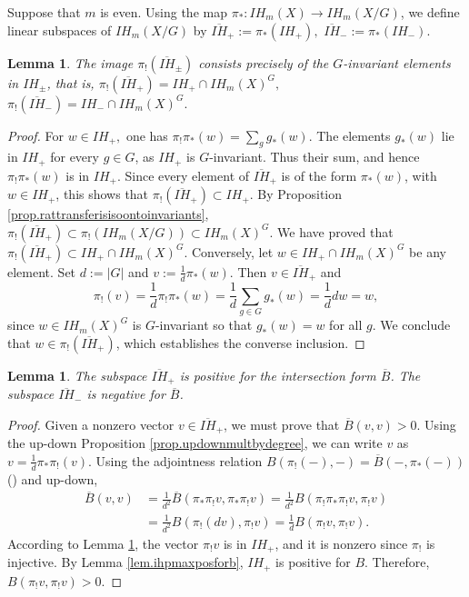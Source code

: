 \documentclass{amsart}
\newtheorem{lemma}[thm]{Lemma}
\theoremstyle{definition}
\theoremstyle{remark}
\begin{document}
Suppose that $m$ is even.
Using the map $\pi_*: IH_m (X) \to IH_m (X/G)$, we define linear subspaces
of $IH_m (X/G)$ by
$\overline{IH}_+ := \pi_* (IH_+),$
$\overline{IH}_- := \pi_* (IH_-).$

\begin{lemma} \label{lem.transfoihisihcapinv}
The image $\pi_! (\overline{IH}_\pm)$ consists precisely of the $G$-invariant
elements in $IH_\pm$, that is,
$\pi_! (\overline{IH}_+) = IH_+ \cap IH_m (X)^G,$
   $\pi_! (\overline{IH}_-) = IH_- \cap IH_m (X)^G.$
\end{lemma}
\begin{proof}
For $w\in IH_+,$ one has $\pi_! \pi_* (w)= \sum_g g_* (w)$.
The elements $g_* (w)$ lie in $IH_+$ for every $g\in G$, 
as $IH_+$ is $G$-invariant.
Thus their sum, and hence $\pi_! \pi_* (w)$ is in $IH_+$.
Since every element of $\overline{IH}_+$ is of the form $\pi_* (w)$,
with $w\in IH_+$, this shows that $\pi_! (\overline{IH}_+) \subset IH_+$.
By Proposition \ref{prop.rattransferisisoontoinvariants},
$\pi_! (\overline{IH}_+) \subset \pi_! (IH_m (X/G))
   \subset IH_m (X)^G.$
We have proved that $\pi_! (\overline{IH}_+) \subset IH_+ \cap IH_m (X)^G$.
Conversely, let $w \in IH_+ \cap IH_m (X)^G$ be any element.
Set $d:=|G|$ and $v := \frac{1}{d} \pi_* (w)$. 
Then $v\in \overline{IH}_+$ and
\[ \pi_! (v) = \mbox{$\frac{1}{d}$} \pi_! \pi_* (w)
   =  \mbox{$\frac{1}{d}$} \sum_{g\in G} g_* (w) =    \mbox{$\frac{1}{d}$} dw =w, \]
since $w\in IH_m (X)^G$ is $G$-invariant so that $g_* (w)=w$ for all $g$.
We conclude that $w\in \pi_! (\overline{IH}_+)$, which 
establishes the converse inclusion.
\end{proof}


\begin{lemma} \label{lem.oihpispos}
The subspace $\overline{IH}_+$ is positive for the 
intersection form $\overline{B}$.
The subspace $\overline{IH}_-$ is negative for $\overline{B}$. 
\end{lemma}
\begin{proof}
Given a nonzero vector $v \in \overline{IH}_+$, we must prove that
$\overline{B}(v,v)>0$.
Using the up-down Proposition \ref{prop.updownmultbydegree}, we can write
$v$ as $v = \frac{1}{d} \pi_* \pi_! (v).$
Using the adjointness relation
$B (\pi_! (-), -) = \overline{B} (-, \pi_* (-))$ (\cite[p. 390, 3.]{gmlefschetz})
and up-down,
\begin{align*}  
\overline{B} (v,v)
&= \mbox{$\frac{1}{d^2}$} \overline{B} (\pi_* \pi_! v, \pi_* \pi_! v) 
 = \mbox{$\frac{1}{d^2}$} B (\pi_! \pi_* \pi_! v, \pi_! v) \\
&= \mbox{$\frac{1}{d^2}$} B (\pi_! (dv), \pi_! v) 
 = \mbox{$\frac{1}{d}$} B (\pi_! v, \pi_! v).
\end{align*}   
According to Lemma \ref{lem.transfoihisihcapinv}, 
the vector $\pi_! v$ is in $IH_+$, and it is nonzero since
$\pi_!$ is injective.
By Lemma \ref{lem.ihpmaxposforb}, $IH_+$ is positive for $B$.
Therefore, $B (\pi_! v, \pi_! v) >0$.
\end{proof}
\end{document}
